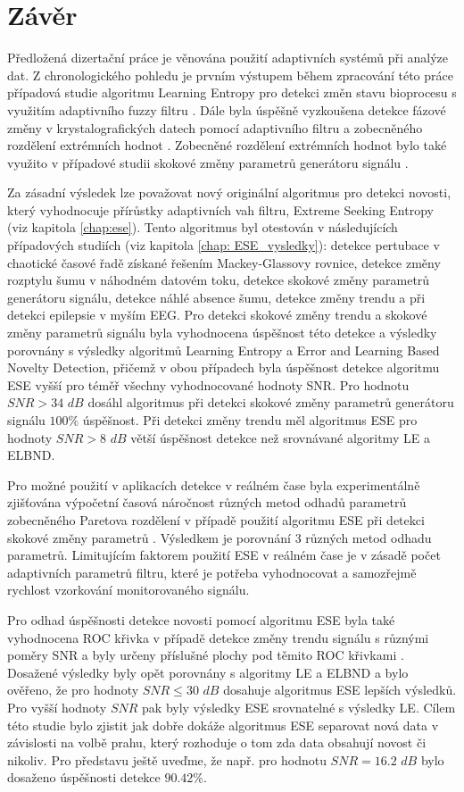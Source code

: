 \chapter{Závěr}
Předložená dizertační práce je věnována použití adaptivních systémů při analýze dat. Z chronologického pohledu je prvním výstupem během zpracování této práce případová studie algoritmu Learning Entropy pro detekci změn stavu bioprocesu s využitím adaptivního fuzzy filtru \cite{artep}. Dále byla úspěšně vyzkoušena detekce fázové změny v krystalografických datech pomocí adaptivního filtru a zobecněného rozdělení extrémních hodnot \cite{asr}. Zobecněné rozdělení extrémních hodnot bylo také využito v případové studii skokové změny parametrů generátoru signálu \cite{appel1}. 
\par 
Za zásadní výsledek lze považovat nový originální algoritmus pro detekci novosti, který vyhodnocuje přírůstky adaptivních vah filtru, Extreme Seeking Entropy \cite{ese_mdpi} (viz kapitola \ref{chap:ese}). Tento algoritmus byl otestován v následujících případových studiích (viz kapitola \ref{chap: ESE_vysledky}): detekce pertubace v chaotické časové řadě získané řešením Mackey-Glassovy rovnice, detekce změny rozptylu šumu v náhodném datovém toku, detekce skokové změny parametrů generátoru signálu, detekce náhlé absence šumu, detekce změny trendu a při detekci epilepsie v myším EEG. Pro detekci skokové změny trendu a skokové změny parametrů signálu byla vyhodnocena úspěšnost této detekce a výsledky porovnány s výsledky algoritmů Learning Entropy a Error and Learning Based Novelty Detection, přičemž v obou případech byla úspěšnost detekce algoritmu ESE vyšší pro téměř všechny vyhodnocované hodnoty SNR. Pro hodnotu $SNR>34$ $dB$ dosáhl algoritmus při detekci skokové změny parametrů generátoru signálu $100\%$ úspěšnost. Při detekci změny trendu měl algoritmus ESE pro hodnoty $SNR>8$ $dB$ větší úspěšnost detekce než srovnávané algoritmy LE a ELBND. 
\par Pro možné použití v aplikacích detekce v reálném čase byla experimentálně zjišťována výpočetní časová náročnost různých metod odhadů parametrů zobecněného Paretova rozdělení v případě použití algoritmu ESE při detekci skokové změny parametrů \cite{appel2}. Výsledkem je porovnání 3 různých metod odhadu parametrů. Limitujícím faktorem použití ESE v reálném čase je v zásadě počet adaptivních parametrů filtru, které je potřeba vyhodnocovat a samozřejmě rychlost vzorkování monitorovaného signálu.
\par Pro odhad úspěšnosti detekce novosti pomocí algoritmu ESE byla také vyhodnocena ROC křivka v případě detekce změny trendu signálu s různými poměry SNR a byly určeny příslušné plochy pod těmito ROC křivkami \cite{appel3}. Dosažené výsledky byly opět porovnány s algoritmy LE a ELBND a bylo ověřeno, že pro hodnoty $SNR \leq 30$ $dB$ dosahuje algoritmus ESE lepších výsledků. Pro vyšší hodnoty $SNR$ pak byly výsledky ESE srovnatelné s výsledky LE.  Cílem této studie bylo zjistit jak dobře dokáže algoritmus ESE separovat nová data v závislosti na volbě prahu, který rozhoduje o tom zda data obsahují novost či nikoliv. Pro představu ještě uveďme, že např. pro hodnotu $SNR=16.2$ $dB$ bylo dosaženo úspěšnosti detekce $90.42\%$.

